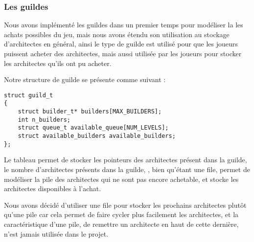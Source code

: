 
\subsubsection{Les guildes}
\label{guild}

Nous avons implémenté les guildes dans un premier temps pour modéliser la les achats possibles du jeu, mais nous avons étendu son utilisation au stockage d'architectes en général, ainsi le type de guilde est utilisé pour que les joueurs puissent acheter des architectes, mais aussi utilisée par les joueurs pour stocker les architectes qu'ils ont pu acheter.

Notre structure de guilde se présente comme suivant :

\begin{lstlisting}[frame=single, caption={Implémentation du type struct guild\_t}]
struct guild_t
{
	struct builder_t* builders[MAX_BUILDERS];
	int n_builders;
	struct queue_t available_queue[NUM_LEVELS];
	struct available_builders available_builders;
};
\end{lstlisting}

Le tableau  permet de stocker les pointeurs  des architectes présent dans la guilde,  le nombre d'architectes présents dans la guilde, , bien qu'étant une file, permet de modéliser la pile des architectes qui ne sont pas encore achetable, et  stocke les architectes disponibles à l'achat.

Nous avons décidé d'utiliser une file pour stocker les prochains architectes plutôt qu'une pile car cela permet de faire cycler plus facilement les architectes, et la caractéristique d'une pile, de remettre un architecte en haut de cette dernière, n'est jamais utilisée dans le projet.



